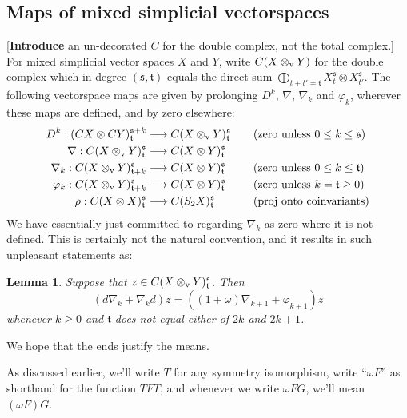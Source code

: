 \documentclass[11pt]{amsart}
\theoremstyle{plain}
\newtheorem{lem}[thm]{Lemma}
\theoremstyle{definition}
\let\phi\varphi
\renewcommand{\to}{\longrightarrow}
\newcommand{\frakt}{\mathfrak{t}}
\newcommand{\fraks}{\mathfrak{s}}
\theoremstyle{plain}
\newcommand{\twist}{\omega}
\newcommand{\Nabla}{\nabla}
\begin{document}
\begin{second quadrant homotopy}
\begin{shaded}
\end{shaded}

\subsection{Maps of mixed simplicial vectorspaces}
[\textbf{Introduce} an un-decorated $C$ for the double complex, not the total complex.]
For mixed simplicial vector spaces $X$ and $Y$, write $C(X\otimes_\textup{v}Y)$ for the double complex which in degree $(\fraks,\frakt)$ equals the direct sum $\bigoplus_{t+t'=\frakt}X_t^\fraks\otimes X_{t'}^\fraks$. The following vectorspace maps are given by prolonging $D^k$, $\Nabla$, $\Nabla_k$ and $\phi_k$, wherever these maps are defined, and by zero elsewhere:
\begin{align*}
{D}^k:(CX\otimes CY)^{\fraks+k}_{\frakt}&\to C(X\otimes_\textup{v}Y)^{\fraks}_{\frakt}&\quad&\textup{(zero unless $0\leq k\leq \fraks$)}\\
{\Nabla}:C(X\otimes_\textup{v} Y)^{\fraks}_{\frakt}&\to C(X\otimes Y)^{\fraks}_{\frakt}\\
{\Nabla}_k:C(X\otimes_\textup{v} Y)^{\fraks}_{\frakt+k}&\to C(X\otimes Y)^{\fraks}_{\frakt}&\quad&\textup{(zero unless $0\leq k\leq \frakt$)}\\
{\phi}_k:C(X\otimes_\textup{v} Y)^{\fraks}_{\frakt+k}&\to C(X\otimes Y)^{\fraks}_{\frakt}&\quad&\textup{(zero unless $k= \frakt\geq0$)}\\
{\rho}:C(X\otimes X)^{\fraks}_{\frakt}&\to C(S_2X)^{\fraks}_{\frakt}&\quad&\textup{(proj onto coinvariants)}
\end{align*}
We have essentially just committed to regarding $\Nabla_k$ as zero where it is not defined. This is certainly not the natural convention, and it results in such unpleasant statements as:
\begin{lem}\label{unpleasant formula}
Suppose that $z\in C(X\otimes_\textup{v} Y)^{\fraks}_{\frakt}$. Then
\[(d\Nabla_k+\Nabla_kd)z=((1+\twist)\Nabla_{k+1}+\phi_{k+1} )z\]
whenever $k\geq0$ and $\frakt$ does not equal either of $2k$ and $2k+1$.
\end{lem}
\noindent We hope that the ends justify the means.

As discussed earlier, we'll write $T$ for any symmetry isomorphism, write ``$\twist F$'' as shorthand for the function $TFT$, and  whenever we write $\twist FG$, we'll mean $(\twist F)G$.


\end{second quadrant homotopy}
\end{document}
